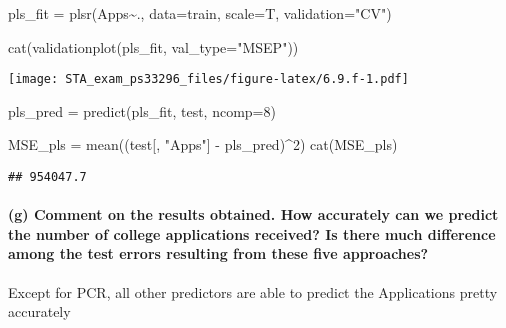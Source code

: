 \documentclass[
]{article}
\newenvironment{Shaded}{\begin{snugshade}}{\end{snugshade}}
\newcommand{\AttributeTok}[1]{\textcolor[rgb]{0.77,0.63,0.00}{#1}}
\newcommand{\DecValTok}[1]{\textcolor[rgb]{0.00,0.00,0.81}{#1}}
\newcommand{\FunctionTok}[1]{\textcolor[rgb]{0.00,0.00,0.00}{#1}}
\newcommand{\NormalTok}[1]{#1}
\newcommand{\OtherTok}[1]{\textcolor[rgb]{0.56,0.35,0.01}{#1}}
\newcommand{\SpecialCharTok}[1]{\textcolor[rgb]{0.00,0.00,0.00}{#1}}
\newcommand{\StringTok}[1]{\textcolor[rgb]{0.31,0.60,0.02}{#1}}
\begin{document}
\begin{Shaded}
\begin{Highlighting}[]
\NormalTok{pls\_fit }\OtherTok{=} \FunctionTok{plsr}\NormalTok{(Apps}\SpecialCharTok{\textasciitilde{}}\NormalTok{., }\AttributeTok{data=}\NormalTok{train, }\AttributeTok{scale=}\NormalTok{T, }\AttributeTok{validation=}\StringTok{"CV"}\NormalTok{)}

\FunctionTok{cat}\NormalTok{(}\FunctionTok{validationplot}\NormalTok{(pls\_fit, }\AttributeTok{val\_type=}\StringTok{"MSEP"}\NormalTok{))}
\end{Highlighting}
\end{Shaded}

\texttt{[image: STA\_exam\_ps33296\_files/figure-latex/6.9.f-1.pdf]}

\begin{Shaded}
\begin{Highlighting}[]
\NormalTok{pls\_pred }\OtherTok{=} \FunctionTok{predict}\NormalTok{(pls\_fit, test, }\AttributeTok{ncomp=}\DecValTok{8}\NormalTok{)}

\NormalTok{MSE\_pls }\OtherTok{=} \FunctionTok{mean}\NormalTok{((test[, }\StringTok{"Apps"}\NormalTok{] }\SpecialCharTok{{-}}\NormalTok{ pls\_pred)}\SpecialCharTok{\^{}}\DecValTok{2}\NormalTok{)}
\FunctionTok{cat}\NormalTok{(MSE\_pls)}
\end{Highlighting}
\end{Shaded}

\begin{verbatim}
## 954047.7
\end{verbatim}

\hypertarget{g-comment-on-the-results-obtained.-how-accurately-can-we-predict-the-number-of-college-applications-received-is-there-much-difference-among-the-test-errors-resulting-from-these-five-approaches}{%
\paragraph{(g) Comment on the results obtained. How accurately can we
predict the number of college applications received? Is there much
difference among the test errors resulting from these five
approaches?}\label{g-comment-on-the-results-obtained.-how-accurately-can-we-predict-the-number-of-college-applications-received-is-there-much-difference-among-the-test-errors-resulting-from-these-five-approaches}}

Except for PCR, all other predictors are able to predict the
Applications pretty accurately
\end{document}
